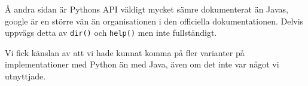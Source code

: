 \documentclass[a4paper, twoside, 11pt]{article}
\begin{document}
Å andra sidan är Pythons API väldigt mycket sämre dokumenterat än Javas, google är en större vän än organisationen i den officiella dokumentationen. Delvis uppvägs detta av \verb|dir()| och \verb|help()| men inte fullständigt.

Vi fick känslan av att vi hade kunnat komma på fler varianter på implementationer med Python än med Java, även om det inte var något vi utnyttjade.
\end{document}
